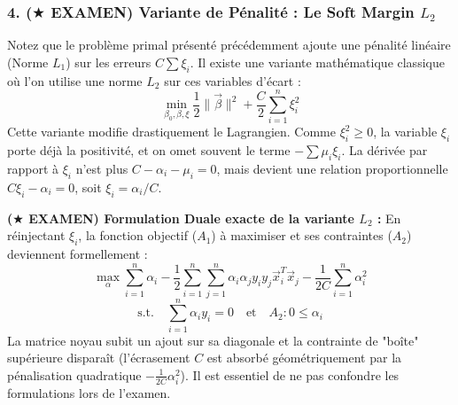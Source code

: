 \subsubsection{4. \textbf{($\bigstar$ EXAMEN)} Variante de Pénalité : Le Soft Margin $L_2$}
Notez que le problème primal présenté précédemment ajoute une pénalité linéaire (Norme $L_1$) sur les erreurs $C \sum \xi_i$. Il existe une variante mathématique classique où l'on utilise une norme $L_2$ sur ces variables d'écart :
\begin{equation}
\min_{\beta_0, \beta, \xi} \frac{1}{2}\|\vec{\beta}\|^{2} + \frac{C}{2} \sum_{i=1}^n \xi_i^2
\end{equation}
Cette variante modifie drastiquement le Lagrangien. Comme $\xi_i^2 \ge 0$, la variable $\xi_i$ porte déjà la positivité, et on omet souvent le terme $-\sum \mu_i \xi_i$. La dérivée par rapport à $\xi_i$ n'est plus $C - \alpha_i - \mu_i = 0$, mais devient une relation proportionnelle $C\xi_i - \alpha_i = 0$, soit $\xi_i = \alpha_i / C$.

\textbf{($\bigstar$ EXAMEN) Formulation Duale exacte de la variante $L_2$ :} En réinjectant $\xi_i$, la fonction objectif ($A_1$) à maximiser et ses contraintes ($A_2$) deviennent formellement :
\begin{equation}
\max_{\alpha} \sum_{i=1}^n \alpha_i - \frac{1}{2} \sum_{i=1}^n \sum_{j=1}^n \alpha_i \alpha_j y_i y_j \vec{x}_i^T \vec{x}_j - \frac{1}{2C} \sum_{i=1}^n \alpha_i^2
\end{equation}
\begin{equation}
\text{s.t.} \quad \sum_{i=1}^n \alpha_i y_i = 0 \quad \text{et} \quad A_2 : 0 \le \alpha_i
\end{equation}
La matrice noyau subit un ajout sur sa diagonale et la contrainte de "boîte" supérieure disparaît (l'écrasement $C$ est absorbé géométriquement par la pénalisation quadratique $-\frac{1}{2C} \alpha_i^2$). Il est essentiel de ne pas confondre les formulations lors de l'examen.

